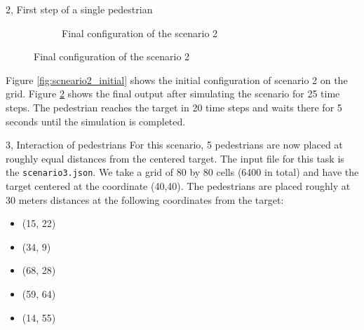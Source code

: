 \documentclass[10pt,a4paper]{article}
\begin{document}
\begin{task}{2, First step of a single pedestrian}
\begin{figure}[H]
\begin{subfigure}[b]{0.4\textwidth}
     \caption{Final configuration of the scenario 2}
     \label{fig:scneario2_final}
 \end{subfigure}
\end{figure}

Figure \ref{fig:scneario2_initial} shows the initial configuration of scenario 2 on the grid.  Figure \ref{fig:scneario2_final} shows the final output after simulating the scenario for 25 time steps. The pedestrian reaches the target in 20 time steps and waits there for 5 seconds until the simulation is completed.

\end{task}

\begin{task}{3, Interaction of pedestrians}
For this scenario, 5 pedestrians are now placed at roughly equal distances from the centered target. The input file for this task is the \verb|scenario3.json|. We take a grid of 80 by 80 cells (6400 in total) and have the target centered at the coordinate (40,40). The pedestrians are placed roughly at 30 meters distances at the following coordinates from the target: 
\begin{itemize}
    \item (15, 22)
    \item (34, 9)
    \item (68, 28)
    \item (59, 64)
    \item (14, 55)
\end{itemize}


\end{task}
\end{document}
